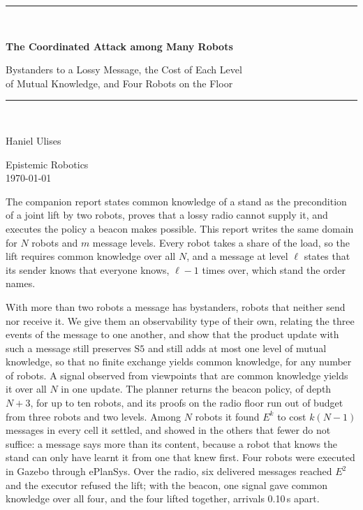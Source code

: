 \documentclass[11pt,a4paper]{article}
\theoremstyle{definition}
\begin{document}
\begin{titlepage}
\centering
\vspace*{2.4cm}
{\color{rulegrey}\rule{\textwidth}{0.8pt}}\\[0.9cm]
{\LARGE\bfseries The Coordinated Attack among Many Robots\par}
\vspace{0.5cm}
{\large\color{slate} Bystanders to a Lossy Message, the Cost of Each Level\\
of Mutual Knowledge, and Four Robots on the Floor\par}
\vspace{0.7cm}
{\color{rulegrey}\rule{\textwidth}{0.8pt}}\\[1.4cm]

{\large Haniel Ulises\par}
\vspace{0.3cm}
{\color{slate} Epistemic Robotics}\\
\vspace{0.15cm}
{\color{slate}\today}

\vfill
{\color{slate}\small
The companion report states common knowledge of a stand as the precondition of
a joint lift by two robots, proves that a lossy radio cannot supply it, and
executes the policy a beacon makes possible. This report writes the same
domain for $N$ robots and $m$ message levels. Every robot takes a share of the
load, so the lift requires common knowledge over all $N$, and a message at
level $\ell$ states that its sender knows that everyone knows, $\ell-1$ times
over, which stand the order names.

\vspace{0.6em}
With more than two robots a message has bystanders, robots that neither send
nor receive it. We give them an observability type of their own, relating the
three events of the message to one another, and show that the product update
with such a message still preserves $\mathrm{S5}$ and still adds at most one
level of mutual knowledge, so that no finite exchange yields common knowledge,
for any number of robots. A signal observed from viewpoints that are common
knowledge yields it over all $N$ in one update. The planner returns the beacon
policy, of depth $N+3$, for up to ten robots, and its proofs on the radio floor
run out of budget from three robots and two levels. Among $N$ robots it found
$E^k$ to cost $k(N-1)$ messages in every cell it settled, and showed in the
others that fewer do not suffice: a message says more than its content,
because a robot that knows the stand can only have learnt it from one that
knew first. Four robots were executed in Gazebo through ePlanSys. Over the
radio, six delivered messages reached $E^2$ and the executor refused the lift;
with the beacon, one signal gave common knowledge over all four, and the four
lifted together, arrivals 0.10\,s apart.}
\vspace{1.2cm}
\end{titlepage}
\end{document}
